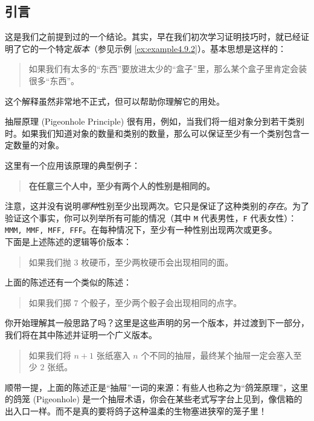 
\subsection{引言}

这是我们之前提到过的一个结论。其实，早在我们初次学习证明技巧时，就已经证明了它的一个特定\emph{版本}（参见示例 \ref{ex:example4.9.2}）。基本思想是这样的：
\begin{quote}
    如果我们有太多的``东西''要放进太少的``盒子''里，那么某个盒子里肯定会装很多``东西''。
\end{quote}
这个解释虽然非常地不正式，但可以帮助你理解它的用处。

抽屉原理 (Pigeonhole Principle) 很有用，例如，当我们将一组对象分到若干类别时。如果我们知道对象的数量和类别的数量，那么可以保证至少有一个类别包含一定数量的对象。

\begin{example}
    这里有一个应用该原理的典型例子：
    \begin{quotation}
        \textbf{在任意三个人中，至少有两个人的性别是相同的。}
    \end{quotation}
    注意，这并没有说明\emph{哪种}性别至少出现两次。它只是保证了这种类别的\emph{存在}。为了验证这个事实，你可以列举所有可能的情况（其中 \verb|M| 代表男性，\verb|F| 代表女性）：\verb|MMM, MMF, MFF, FFF|。在每种情况下，至少有一种性别出现两次或更多。\\
    下面是上述陈述的逻辑等价版本：
    \begin{quotation}
        如果我们抛 $3$ 枚硬币，至少两枚硬币会出现相同的面。
    \end{quotation}
    上面的陈述还有一个类似的陈述：
    \begin{quotation}
        如果我们掷 $7$ 个骰子，至少两个骰子会出现相同的点字。
    \end{quotation}
    你开始理解其一般思路了吗？这里是这些声明的另一个版本，并过渡到下一部分，我们将在其中陈述并证明一个广义版本。
    \begin{quotation}
        如果我们将 $n + 1$ 张纸塞入 $n$ 个不同的抽屉，最终某个抽屉一定会塞入至少 $2$ 张纸。
    \end{quotation}
    顺带一提，上面的陈述正是``抽屉''一词的来源：有些人也称之为``鸽笼原理''，这里的鸽笼 (Pigeonhole) 是一个抽屉术语，你会在某些老式写字台上见到，像信箱的出入口一样。而不是真的要将鸽子这种温柔的生物塞进狭窄的笼子里！
\end{example}